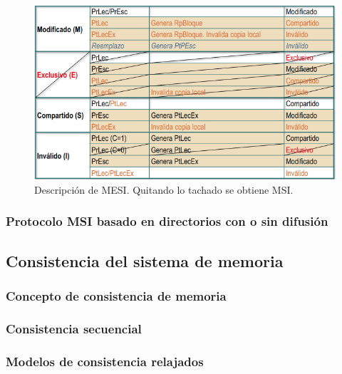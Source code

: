\documentclass[12pt,spanish]{article}
\begin{document}
\begin{figure}[H]
\centering
\includegraphics[scale=0.75]{mesi.png}
\caption{Descripción de MESI. Quitando lo tachado se obtiene MSI.}
\end{figure}

\subsubsection{Protocolo MSI basado en directorios con o sin difusión}






\subsection{Consistencia del sistema de memoria}

\subsubsection{Concepto de consistencia de memoria}





\subsubsection{Consistencia secuencial}






\subsubsection{Modelos de consistencia relajados}
\end{document}
